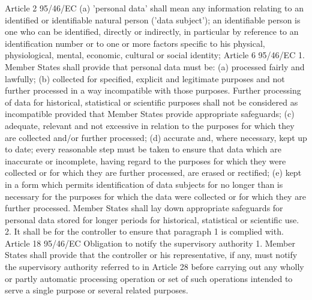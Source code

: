 Article 2 95/46/EC
(a) 'personal data' shall mean any information relating to an identified or identifiable natural person ('data subject'); an identifiable person is one who can be identified, directly or indirectly, in particular by reference to an identification number or to one or more factors specific to his physical, physiological, mental, economic, cultural or social identity;
Article 6 95/46/EC
1. Member States shall provide that personal data must be:
(a) processed fairly and lawfully;
(b) collected for specified, explicit and legitimate purposes and not further processed in a way incompatible with those purposes. Further processing of data for historical, statistical or scientific purposes shall not be considered as incompatible provided that Member States provide appropriate safeguards;
(c) adequate, relevant and not excessive in relation to the purposes for which they are collected and/or further processed;
(d) accurate and, where necessary, kept up to date; every reasonable step must be taken to ensure that data which are inaccurate or incomplete, having regard to the purposes for which they were collected or for which they are further processed, are erased or rectified;
(e) kept in a form which permits identification of data subjects for no longer than is necessary for the purposes for which the data were collected or for which they are further processed. Member States shall lay down appropriate safeguards for personal data stored for longer periods for historical, statistical or scientific use.
2. It shall be for the controller to ensure that paragraph 1 is complied with.
Article 18 95/46/EC
Obligation to notify the supervisory authority
1. Member States shall provide that the controller or his representative, if any, must notify the supervisory authority referred to in Article 28 before carrying out any wholly or partly automatic processing operation or set of such operations intended to serve a single purpose or several related purposes.